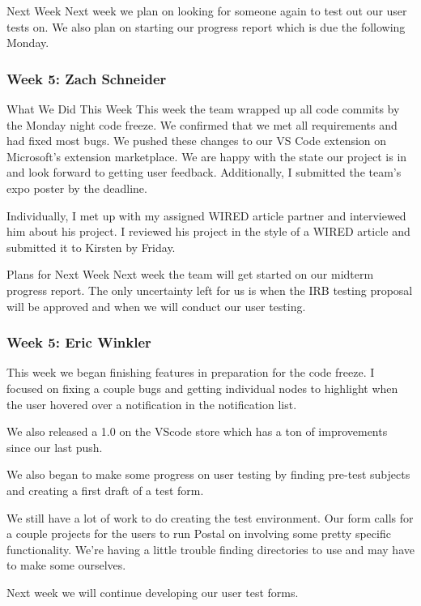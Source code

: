 Next Week
Next week we plan on looking for someone again to test out our user tests on. We also plan on starting our progress report which is due the following Monday.

\subsubsection{Week 5: Zach Schneider}

What We Did This Week
This week the team wrapped up all code commits by the Monday night code freeze. We confirmed that we met all requirements and had fixed most bugs. We pushed these changes to our VS Code extension on Microsoft's extension marketplace. We are happy with the state our project is in and look forward to getting user feedback. Additionally, I submitted the team's expo poster by the deadline. 

Individually, I met up with my assigned WIRED article partner and interviewed him about his project. I reviewed his project in the style of a WIRED article and submitted it to Kirsten by Friday. 

Plans for Next Week
Next week the team will get started on our midterm progress report. The only uncertainty left for us is when the IRB testing proposal will be approved and when we will conduct our user testing.

\subsubsection{Week 5: Eric Winkler}

This week we began finishing features in preparation for the code freeze. I focused on fixing a couple bugs and getting individual nodes to highlight when the user hovered over a notification in the notification list. 

We also released a 1.0 on the VScode store which has a ton of improvements since our last push. 

We also began to make some progress on user testing by finding pre-test subjects and creating a first draft of a test form.

We still have a lot of work to do creating the test environment. Our form calls for a couple projects for the users to run Postal on involving some pretty specific functionality. We're having a little trouble finding directories to use and may have to make some ourselves.

Next week we will continue developing our user test forms.

